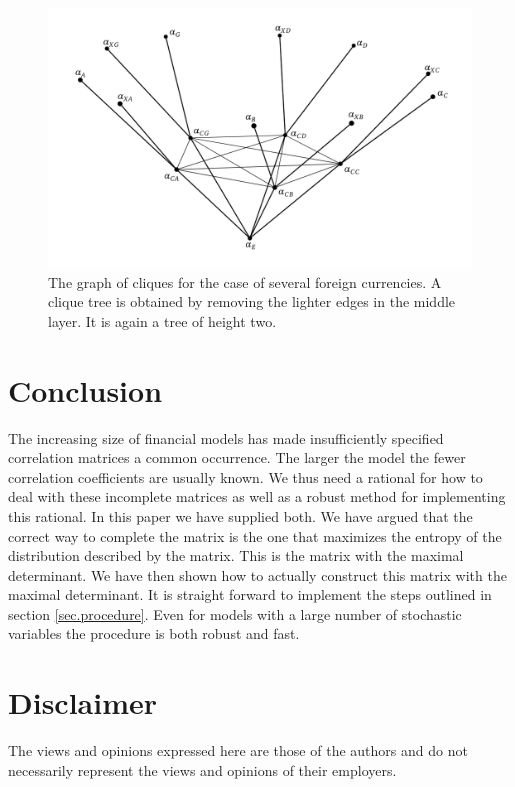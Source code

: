 \documentclass[11pt, a4paper]{article}
\begin{document}
\begin{figure}[hbt]
  \begin{center}
  	\includegraphics[width=12cm]{img/severalCurrCliques.png}
  \end{center}
  \caption{The graph of cliques for the case of several foreign currencies. A clique tree is obtained by removing the lighter edges in the middle layer. It is again a tree of height two.}\label{fig.severalCliques}
\end{figure}

\section{Conclusion}\label{sec.conclusion}
The increasing size of financial models has made insufficiently specified correlation matrices a common occurrence. The larger the model the fewer correlation coefficients are usually known. We thus need a rational for how to deal with these incomplete matrices as well as a robust method for implementing this rational. In this paper we have supplied both. We have argued that the correct way to complete the matrix is the one that maximizes the entropy of the distribution described by the matrix. This is the matrix with the maximal determinant. We have then shown how to actually construct this matrix with the maximal determinant. It is straight forward to implement the steps outlined in section \ref{sec.procedure}. Even for models with a large number of stochastic variables the procedure is both robust and fast. 

\vspace{2cm}

\section*{Disclaimer}
The views and opinions expressed here are those of the authors and do not necessarily represent the views and opinions of their employers.
\end{document}
